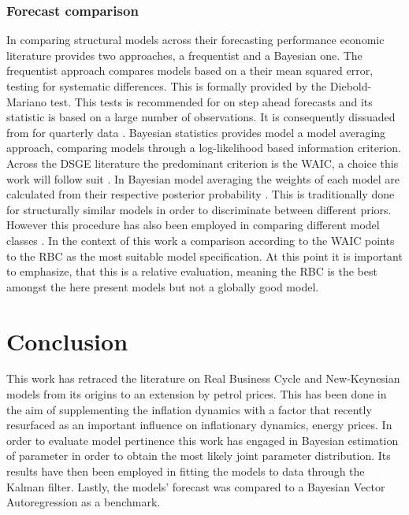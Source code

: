 \documentclass[12pt,a4paper,english]{article} %
\let\oldsection\section
\renewcommand\section{\clearpage\oldsection}
\begin{document}
	\subsubsection{Forecast comparison}
	In comparing structural models across their forecasting performance economic literature provides two approaches, a frequentist and a Bayesian one. The frequentist approach compares models based on a their mean squared error, testing for systematic differences. This is formally provided by the Diebold-Mariano test. This tests is recommended for on step ahead forecasts and its statistic is based on a large number of observations. It is consequently dissuaded from for quarterly data \cite{chin_bayesian_2019}. Bayesian statistics provides model a model averaging approach, comparing models through a log-likelihood based information criterion. Across the DSGE literature the predominant criterion is the \ac{WAIC}, a choice this work will follow suit \cite{chin_bayesian_2019}. In Bayesian model averaging the weights of each model are calculated from their respective posterior probability \cite{chin_bayesian_2019}. This is traditionally done for structurally similar models in order to discriminate between different priors. However this procedure has also been employed in comparing different model classes \cite{chin_bayesian_2019}. In the context of this work a comparison according to the \ac{WAIC} points to the RBC as the most suitable model specification. At this point it is important to emphasize, that this is a relative evaluation, meaning the RBC is the best amongst the here present models but not a globally good model.
	
	\section{Conclusion}
	This work has retraced the literature on Real Business Cycle and New-Keynesian models from its origins to an extension by petrol prices. This has been done in the aim of supplementing the inflation dynamics with a factor that recently resurfaced as an important influence on inflationary dynamics, energy prices.
	In order to evaluate model pertinence this work has engaged in Bayesian estimation of parameter in order to obtain the most likely joint parameter distribution. Its results have then been employed in fitting the models to data through the Kalman filter. Lastly, the models' forecast was compared to a Bayesian Vector Autoregression as a benchmark.
	
\end{document}
